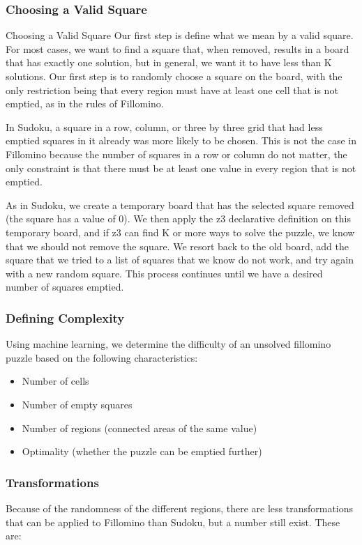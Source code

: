 \subsubsection{Choosing a Valid Square}
Choosing a Valid Square
Our first step is define what we mean by a valid square. For most
cases, we want to find a square that, when removed, results in a board
that has exactly one solution, but in general, we want it to have less
than K solutions. Our first step is to randomly choose a square on the
board, with the only restriction being that every region must have at
least one cell that is not emptied, as in the rules of Fillomino. 

In Sudoku, a square in a row, column, or three by three grid that had
less emptied squares in it already was more likely to be chosen. This
is not the case in Fillomino because the number of squares in a row or
column do not matter, the only constraint is that there must be at
least one value in every region that is not emptied.
 
As in Sudoku, we create a temporary board that has the selected square
removed (the square has a value of 0). We then apply the z3
declarative definition on this temporary board, and if z3 can find K
or more ways to solve the puzzle, we know that we should not remove
the square. We resort back to the old board, add the square that we
tried to a list of squares that we know do not work, and try again
with a new random square. This process continues until we have a
desired number of squares emptied.

\subsubsection{Defining Complexity}
Using machine learning, we determine the difficulty of an unsolved
fillomino puzzle based on the following characteristics:


\begin{itemize}
\item Number of cells
\item Number of empty squares
\item Number of regions (connected areas of the same value)
\item Optimality (whether the puzzle can be emptied further)
\end{itemize}

\subsubsection{Transformations}
Because of the randomness of the different regions, there are less
transformations that can be applied to Fillomino than Sudoku, but a
number still exist. These are:

